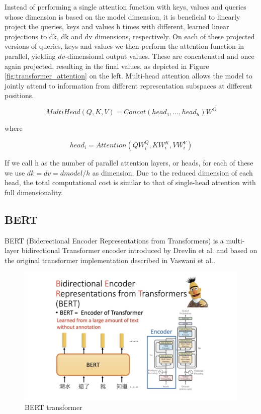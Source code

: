 Instead of performing a single attention function with keys, values and queries whose dimension is based on the model dimension, it is beneficial to linearly project the queries, keys and values h times with different, learned linear projections to dk, dk and dv dimensions, respectively. On each of these projected versions of queries, keys and values we then perform the attention function in parallel, yielding $dv$-dimensional output values. These are concatenated and once again projected, resulting in the final values, as depicted in Figure \ref{fig:transformer_attention} on the left.
Multi-head attention allows the model to jointly attend to information from different representation subspaces at different positions.
\begin{large}
$$MultiHead(Q, K, V ) = Concat(head_{1}, ..., head_{h})W^O$$
\begin{center}where\end{center}
$$head_{i} = Attention(QW^Q_{i}, KW^K_{i}, VW^V_{i})$$
\end{large}

If we call h as the number of parallel attention layers, or heads, for each of these we use $dk=dv=dmodel/h$ as dimension. Due to the reduced dimension of each head, the total computational cost is similar to that of single-head attention with full dimensionality.
\subsection{BERT}
BERT (Biderectional Encoder Representations from Transformers) is a multi-layer bidirectional Transformer encoder introduced by Drevlin et al. \cite{devlin2018bert} and  based on the original transformer implementation described in Vaswani et al.\cite{vaswani2017attention}.
\begin{figure}[H]%
    \centering
    \includegraphics[width=1\linewidth]{images/BERT.png}
    \caption{BERT transformer}
    \label{fig:bert_transformer}
\end{figure}

